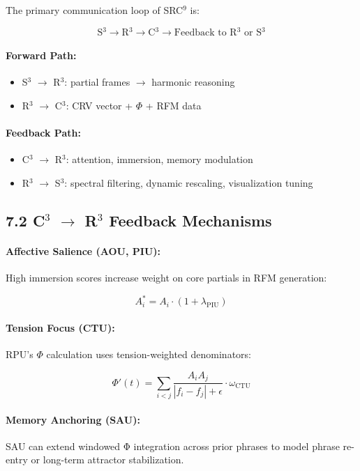 \documentclass[10pt]{article}
\begin{document}
The primary communication loop of SRC$^{9}$ is:

\[
\text{S$^3$} \rightarrow \text{R$^3$} \rightarrow \text{C$^3$} \rightarrow \text{Feedback to R$^3$ or S$^3$}
\]

\paragraph{Forward Path:}
\begin{itemize}
    \item S$^3$ $\rightarrow$ R$^3$: partial frames $\rightarrow$ harmonic reasoning
    \item R$^3$ $\rightarrow$ C$^3$: CRV vector + $\Phi$ + RFM data
\end{itemize}

\paragraph{Feedback Path:}
\begin{itemize}
    \item C$^3$ $\rightarrow$ R$^3$: attention, immersion, memory modulation
    \item R$^3$ $\rightarrow$ S$^3$: spectral filtering, dynamic rescaling, visualization tuning
\end{itemize}

\subsection*{7.2 C$^3$ $\rightarrow$ R$^3$ Feedback Mechanisms}

\paragraph{Affective Salience (AOU, PIU):}
High immersion scores increase weight on core partials in RFM generation:

\[
A_i^{*} = A_i \cdot (1 + \lambda_{\text{PIU}})
\]

\paragraph{Tension Focus (CTU):}
RPU’s $\Phi$ calculation uses tension-weighted denominators:

\[
\Phi'(t) = \sum_{i<j} \frac{A_i A_j}{|f_i - f_j| + \epsilon} \cdot \omega_{\text{CTU}}
\]

\paragraph{Memory Anchoring (SAU):}
SAU can extend windowed Φ integration across prior phrases to model phrase re-entry or long-term attractor stabilization.
\end{document}
